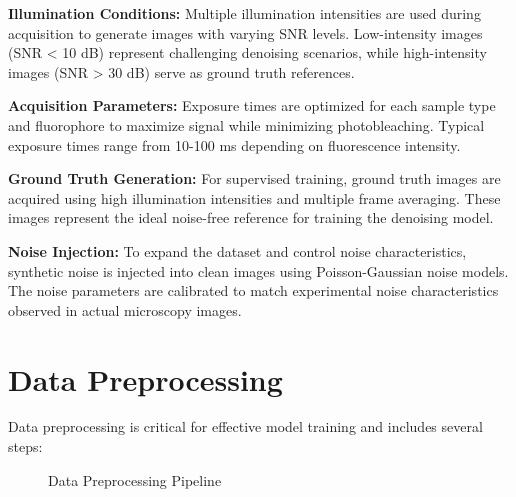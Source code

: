 \documentclass[12pt,a4paper]{report}
\begin{document}
\vspace{0.5cm}

\textbf{Illumination Conditions:} Multiple illumination intensities are used during acquisition to generate images with varying SNR levels. Low-intensity images (SNR < 10 dB) represent challenging denoising scenarios, while high-intensity images (SNR > 30 dB) serve as ground truth references.

\vspace{0.5cm}

\textbf{Acquisition Parameters:} Exposure times are optimized for each sample type and fluorophore to maximize signal while minimizing photobleaching. Typical exposure times range from 10-100 ms depending on fluorescence intensity.

\vspace{0.5cm}

\textbf{Ground Truth Generation:} For supervised training, ground truth images are acquired using high illumination intensities and multiple frame averaging. These images represent the ideal noise-free reference for training the denoising model.

\vspace{0.5cm}

\textbf{Noise Injection:} To expand the dataset and control noise characteristics, synthetic noise is injected into clean images using Poisson-Gaussian noise models. The noise parameters are calibrated to match experimental noise characteristics observed in actual microscopy images.

\section{Data Preprocessing}

Data preprocessing is critical for effective model training and includes several steps:

\vspace{0.5cm}

\begin{figure}[H]
\centering
{}
\caption{Data Preprocessing Pipeline}
\label{fig:preprocessing}
\end{figure}
\end{document}
